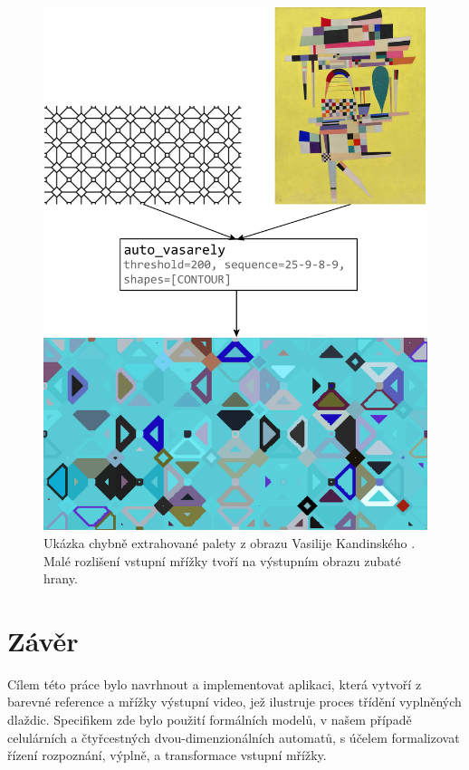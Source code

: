 \begin{figure}
    \centering
    \includegraphics[width=\textwidth]{obrazky-figures/square_tiles.pdf}
    \caption{Ukázka chybně extrahované palety z obrazu Vasilije Kandinského \cite{yellow}. Malé rozlišení vstupní mřížky tvoří na výstupním obrazu zubaté hrany. }
    \label{fig:square_tiles}
\end{figure}

\chapter{Závěr}
\label{conclusion}

Cílem této práce bylo navrhnout a implementovat aplikaci, která vytvoří z barevné reference a mřížky výstupní video, jež ilustruje proces třídění vyplněných dlaždic. Specifikem zde bylo použití formálních modelů, v našem případě celulárních a čtyřcestných dvou-dimenzionálních automatů, s účelem formalizovat řízení rozpoznání, výplně, a transformace vstupní mřížky. 

